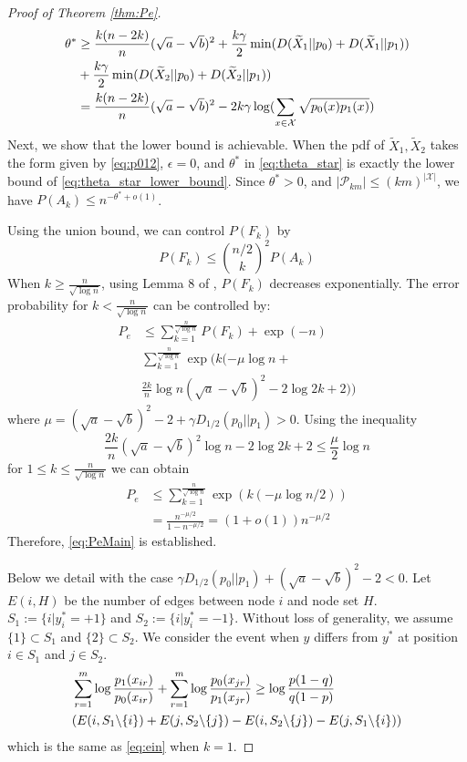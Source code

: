 \documentclass[conference]{IEEEtran}
\begin{document}
\begin{proof}[Proof of Theorem \ref{thm:Pe}]
{\scriptsize
\begin{align}
\theta^* &\geq \frac{k(n-2k)}{n}(\sqrt{a} - \sqrt{b})^2
+ \frac{k \gamma}{2}\min (D(\widetilde{X}_1||p_0) + D(\widetilde{X}_1||p_1)) \notag \\
&+ \frac{k \gamma}{2}\min (D(\widetilde{X}_2||p_0) + D(\widetilde{X}_2||p_1))\notag \\
&=  \frac{k(n-2k)}{n}(\sqrt{a} - \sqrt{b})^2 - 2 k\gamma\log(\sum_{x\in\mathcal{X}}\sqrt{p_0(x)p_1(x)}) 
\label{eq:theta_star_lower_bound}
\end{align}
}
Next, we show that the lower bound is achievable.
When the pdf of $\widetilde{X}_1, \widetilde{X}_2$ takes the form given by \eqref{eq:p012},
$\epsilon = 0$, and $\theta^*$ in \eqref{eq:theta_star} is exactly the lower bound of \eqref{eq:theta_star_lower_bound}.
Since $\theta^*>0$,
and $|\mathcal{P}_{km}|\leq (km)^{|\mathcal{X}|} $, we have $P(A_k) \leq n^{-\theta^*+o(1)}$.

Using the union bound, we can control $P(F_k)$ by
$$
P(F_k) \leq \binom{n/2}{k}^2 P(A_k)
$$
When $k \geq \frac{n}{\sqrt{\log n}}$, using Lemma 8 of \cite{feng2021},
$P(F_k)$ decreases exponentially. The error probability for $k < \frac{n}{\sqrt{\log n}}$
can be controlled by:
\begin{align*}
P_e &\leq \sum_{k=1}^{\frac{n}{\sqrt{\log n}}} P(F_k) + \exp(-n) \\
& \sum_{k=1}^{\frac{n}{\sqrt{\log n}}} \exp(k(-\mu \log n + \\
&\frac{2k}{n} \log n(\sqrt{a} - \sqrt{b})^2 - 2\log 2k + 2))
\end{align*}
where $\mu = (\sqrt{a} - \sqrt{b})^2-2 + \gamma D_{1/2}(p_0||p_1) > 0$.
Using the inequality
$$
\frac{2k}{n}(\sqrt{a} - \sqrt{b})^2\log n -2\log2k+2\leq \frac{\mu}{2} \log n
$$
for $1\leq k \leq \frac{n}{\sqrt{\log n}}$ we can obtain
\begin{align*}
P_e &\leq \sum_{k=1}^{\frac{n}{\sqrt{\log n}}} \exp(k(-\mu \log n/2)) \\
& = \frac{n^{-\mu / 2}}{1-n^{-\mu / 2}} = (1+o(1))n^{-\mu / 2}
\end{align*}
Therefore, \eqref{eq:PeMain} is established.

Below we detail with the case $\gamma D_{1/2}(p_0||p_1) + (\sqrt{a} - \sqrt{b})^2-2 < 0$.
Let $E(i, H)$ be the number of edges between node $i$ and node set $H$. $S_1:=\{i | y^*_i = +1 \}$
and $S_2:=\{i | y^*_i = -1 \}$. Without loss of generality, we assume $\{1\}\subset S_1$
and $\{2\} \subset S_2$.
We consider the event when $y$ differs from $y^*$ at position $i \in S_1$ and $j \in S_2$.
\begin{align}
&\sum_{r=1}^{m} \log \frac{p_1(x_{ir})}{p_0(x_{ir})}
+\sum_{r=1}^{m} \log \frac{p_0(x_{jr})}{p_1(x_{jr})}
\geq\log \frac{p(1-q)}{q(1-p)} \notag\\
& (E(i, S_1 \backslash \{i\}) + E(j, S_2 \backslash \{j\})
- E(i, S_2 \backslash \{j\}) - E(j, S_1 \backslash \{i\})) \label{eq:F1ij}
\end{align}
which is the same as \eqref{eq:ein} when $k=1$.


\end{proof}
\end{document}
